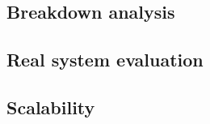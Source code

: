 \documentclass[conference]{IEEEtran}
\begin{document}
\subsection{Breakdown analysis}





\subsection{Real system evaluation}


\subsection{Scalability}









% 
% 




\end{document}
